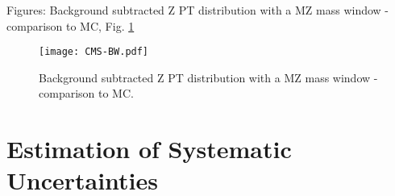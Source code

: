 Figures: Background subtracted Z PT distribution with a MZ mass window - comparison to MC, Fig. \ref{fig:YieldVsZPtComparedToMC}

 \begin{figure}[htb]
  \begin{center}
    \texttt{[image: CMS-BW.pdf]}
  \end{center}
  \caption[Background subtracted Z PT distribution with a MZ mass window - comparison to MC]{Background subtracted Z PT distribution with a MZ mass window - comparison to MC.}
  \label{fig:YieldVsZPtComparedToMC}
 \end{figure}


\section{Estimation of Systematic Uncertainties}
